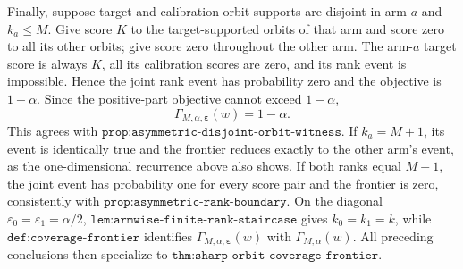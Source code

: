 Finally, suppose target and calibration orbit supports are disjoint in arm \(a\) and \(k_a\le M\). Give score \(K\) to the target-supported orbits of that arm and score zero to all its other orbits; give score zero throughout the other arm. The arm-\(a\) target score is always \(K\), all its calibration scores are zero, and its rank event is impossible. Hence the joint rank event has probability zero and the objective is \(1-\alpha\). Since the positive-part objective cannot exceed \(1-\alpha\),
\[
\Gamma_{M,\alpha,\boldsymbol\varepsilon}(w)=1-\alpha.
\]
This agrees with \(\texttt{prop:asymmetric-disjoint-orbit-witness}\). If \(k_a=M+1\), its event is identically true and the frontier reduces exactly to the other arm's event, as the one-dimensional recurrence above also shows. If both ranks equal \(M+1\), the joint event has probability one for every score pair and the frontier is zero, consistently with \(\texttt{prop:asymmetric-rank-boundary}\). On the diagonal \(\varepsilon_0=\varepsilon_1=\alpha/2\), \(\texttt{lem:armwise-finite-rank-staircase}\) gives \(k_0=k_1=k\), while \(\texttt{def:coverage-frontier}\) identifies \(\Gamma_{M,\alpha,\boldsymbol\varepsilon}(w)\) with \(\Gamma_{M,\alpha}(w)\). All preceding conclusions then specialize to \(\texttt{thm:sharp-orbit-coverage-frontier}\).